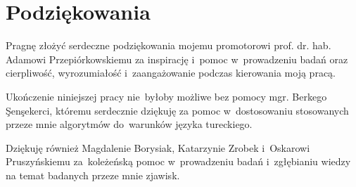     \thispagestyle{empty}
    \setcounter{page}{3}

\chapter*{Podziękowania}

Pragnę złożyć serdeczne podziękowania mojemu promotorowi prof. dr. hab. Adamowi Przepiórkowskiemu za inspirację i~pomoc w~prowadzeniu badań oraz cierpliwość, wyrozumiałość i~zaangażowanie podczas kierowania moją pracą.

Ukończenie niniejszej pracy nie~byłoby możliwe bez pomocy mgr. Berkego \c{S}en\c{s}ekerci, któremu serdecznie dziękuję za pomoc w~dostosowaniu stosowanych przeze mnie algorytmów do~warunków języka tureckiego.

Dziękuję również Magdalenie Borysiak, Katarzynie Zrobek i~Oskarowi Pruszyńskiemu za~koleżeńską pomoc w~prowadzeniu badań i~zgłębianiu wiedzy na temat badanych przeze mnie zjawisk.
    
    \tableofcontents